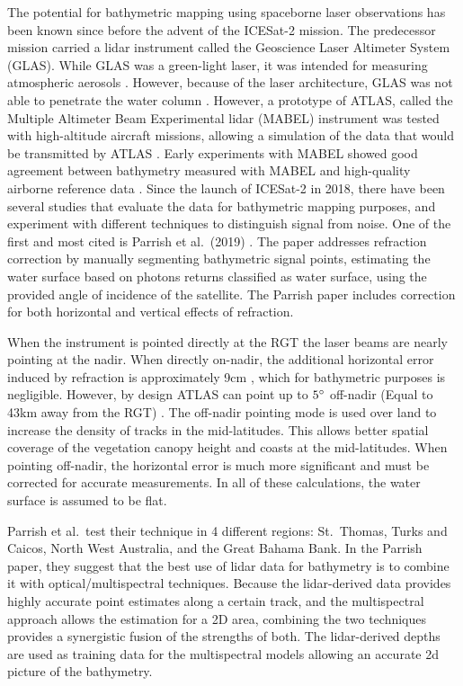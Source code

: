 The potential for bathymetric mapping using spaceborne laser observations has been known since before the advent of the ICESat-2 mission. The predecessor mission carried a lidar instrument called the Geoscience Laser Altimeter System (GLAS). While GLAS was a green-light laser, it was intended for measuring atmospheric aerosols \parencite{Abshire2005}. However, because of the laser architecture, GLAS was not able to penetrate the water column \parencite{Forfinski-Sarkozi2016}. However, a prototype of ATLAS, called the Multiple Altimeter Beam Experimental lidar (MABEL) instrument was tested with high-altitude aircraft missions, allowing a simulation of the data that would be transmitted by ATLAS \parencite{Mcgill2013}. Early experiments with MABEL showed good agreement between bathymetry measured with MABEL and high-quality airborne reference data \parencite{Jasinski2016,Forfinski-Sarkozi2016}. Since the launch of ICESat-2 in 2018, there have been several studies that evaluate the data for bathymetric mapping purposes, and experiment with different techniques to distinguish signal from noise. One of the first and most cited is Parrish et al.~(2019) \parencite{Parrish2019}. The paper addresses refraction correction by manually segmenting bathymetric signal points, estimating the water surface based on photons returns classified as water surface, using the provided angle of incidence of the satellite. The Parrish paper includes correction for both horizontal and vertical effects of refraction.

When the instrument is pointed directly at the RGT the laser beams are nearly pointing at the nadir. When directly on-nadir, the additional horizontal error induced by refraction is approximately 9cm \parencite{Parrish2019}, which for bathymetric purposes is negligible. However, by design ATLAS can point up to $5 \degree$ off-nadir (Equal to 43km away from the RGT) \parencite{Magruder2021}. The off-nadir pointing mode is used over land to increase the density of tracks in the mid-latitudes. This allows better spatial coverage of the vegetation canopy height and coasts at the mid-latitudes. When pointing off-nadir, the horizontal error is much more significant and must be corrected for accurate measurements. In all of these calculations, the water surface is assumed to be flat.

Parrish et al.~test their technique in 4 different regions: St.~Thomas, Turks and Caicos, North West Australia, and the Great Bahama Bank. In the Parrish paper, they suggest that the best use of lidar data for bathymetry is to combine it with optical/multispectral techniques. Because the lidar-derived data provides highly accurate point estimates along a certain track, and the multispectral approach allows the estimation for a 2D area, combining the two techniques provides a synergistic fusion of the strengths of both. The lidar-derived depths are used as training data for the multispectral models allowing an accurate 2d picture of the bathymetry.

